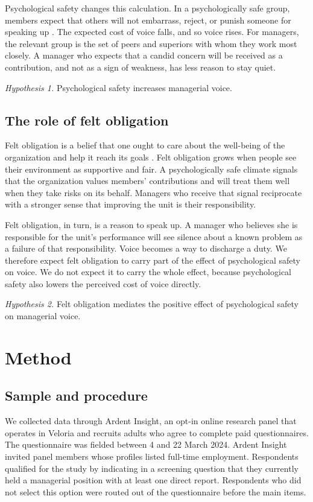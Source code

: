 \documentclass[12pt]{article}
\begin{document}
Psychological safety changes this calculation. In a psychologically safe group, members expect that others will not embarrass, reject, or punish someone for speaking up \citep{dravenko2015}. The expected cost of voice falls, and so voice rises. For managers, the relevant group is the set of peers and superiors with whom they work most closely. A manager who expects that a candid concern will be received as a contribution, and not as a sign of weakness, has less reason to stay quiet.

\medskip
\noindent\textit{Hypothesis 1.} Psychological safety increases managerial voice.

\subsection{The role of felt obligation}

Felt obligation is a belief that one ought to care about the well-being of the organization and help it reach its goals \citep{quennell2016}. Felt obligation grows when people see their environment as supportive and fair. A psychologically safe climate signals that the organization values members' contributions and will treat them well when they take risks on its behalf. Managers who receive that signal reciprocate with a stronger sense that improving the unit is their responsibility.

Felt obligation, in turn, is a reason to speak up. A manager who believes she is responsible for the unit's performance will see silence about a known problem as a failure of that responsibility. Voice becomes a way to discharge a duty. We therefore expect felt obligation to carry part of the effect of psychological safety on voice. We do not expect it to carry the whole effect, because psychological safety also lowers the perceived cost of voice directly.

\medskip
\noindent\textit{Hypothesis 2.} Felt obligation mediates the positive effect of psychological safety on managerial voice.

\section{Method}

\subsection{Sample and procedure}

We collected data through Ardent Insight, an opt-in online research panel that operates in Veloria and recruits adults who agree to complete paid questionnaires. The questionnaire was fielded between 4 and 22 March 2024. Ardent Insight invited panel members whose profiles listed full-time employment. Respondents qualified for the study by indicating in a screening question that they currently held a managerial position with at least one direct report. Respondents who did not select this option were routed out of the questionnaire before the main items.
\end{document}
